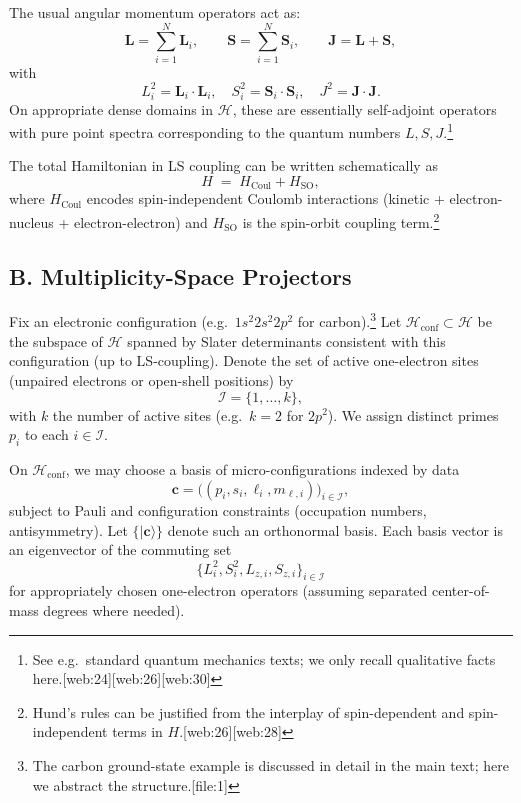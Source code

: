 \documentclass[11pt]{article}
\begin{document}
The usual angular momentum operators act as:
\[
\mathbf{L} = \sum_{i=1}^N \mathbf{L}_i, \qquad
\mathbf{S} = \sum_{i=1}^N \mathbf{S}_i, \qquad
\mathbf{J} = \mathbf{L} + \mathbf{S},
\]
with
\[
L_i^2 = \mathbf{L}_i \cdot \mathbf{L}_i, \quad
S_i^2 = \mathbf{S}_i \cdot \mathbf{S}_i, \quad
J^2 = \mathbf{J} \cdot \mathbf{J}.
\]
On appropriate dense domains in \(\mathcal{H}\), these are essentially self-adjoint operators with pure point spectra corresponding to the quantum numbers \(L, S, J\).\footnote{See e.g.\ standard quantum mechanics texts; we only recall qualitative facts here.[web:24][web:26][web:30]}

The total Hamiltonian in LS coupling can be written schematically as
\[
H \;=\; H_{\text{Coul}} + H_{\text{SO}},
\]
where \(H_{\text{Coul}}\) encodes spin-independent Coulomb interactions (kinetic + electron-nucleus + electron-electron) and \(H_{\text{SO}}\) is the spin-orbit coupling term.\footnote{Hund's rules can be justified from the interplay of spin-dependent and spin-independent terms in \(H\).[web:26][web:28]}

\subsection*{B. Multiplicity-Space Projectors}

Fix an electronic configuration (e.g.\ \(1s^2 2s^2 2p^2\) for carbon).\footnote{The carbon ground-state example is discussed in detail in the main text; here we abstract the structure.[file:1]} Let \(\mathcal{H}_{\text{conf}} \subset \mathcal{H}\) be the subspace of \(\mathcal{H}\) spanned by Slater determinants consistent with this configuration (up to LS-coupling). Denote the set of active one-electron sites (unpaired electrons or open-shell positions) by
\[
\mathcal{I} = \{1,\dots,k\},
\]
with \(k\) the number of active sites (e.g.\ \(k=2\) for \(2p^2\)). We assign distinct primes \(p_i\) to each \(i\in\mathcal{I}\).

On \(\mathcal{H}_{\text{conf}}\), we may choose a basis of micro-configurations indexed by data
\[
\mathbf{c} = \big( (p_i, s_i, \ell_i, m_{\ell,i}) \big)_{i\in\mathcal{I}},
\]
subject to Pauli and configuration constraints (occupation numbers, antisymmetry). Let \(\{ \lvert \mathbf{c} \rangle \}\) denote such an orthonormal basis. Each basis vector is an eigenvector of the commuting set
\[
\{ L_i^2, S_i^2, L_{z,i}, S_{z,i} \}_{i\in\mathcal{I}}
\]
for appropriately chosen one-electron operators (assuming separated center-of-mass degrees where needed).
\end{document}
